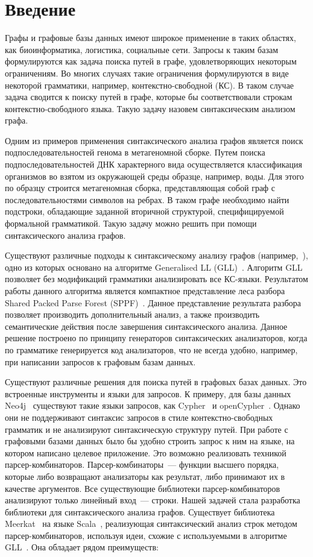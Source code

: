 \section*{Введение}
Графы и графовые базы данных имеют широкое применение в таких областях, как биоинформатика, логистика, социальные сети. Запросы к таким базам формулируются как задача поиска путей в графе, удовлетворяющих некоторым ограничениям. Во многих случаях такие ограничения формулируются в виде некоторой грамматики, например, контекстно-свободной (КС). В таком случае задача сводится к поиску путей в графе, которые бы соответствовали строкам контекстно-свободного языка. Такую задачу назовем синтаксическим анализом графа. 

Одним из примеров применения синтаксического анализа графов является поиск подпоследовательностей генома в метагеномной сборке. Путем поиска подпоследовательностей ДНК характерного вида осуществляется классификация организмов во взятом из окружающей среды образце, например, воды. Для этого по образцу строится метагеномная сборка, представляющая собой граф с последовательностями символов на ребрах. В таком графе необходимо найти подстроки, обладающие заданной вторичной структурой, специфицируемой формальной грамматикой. Такую задачу можно решить при помощи синтаксического анализа графов.

Существуют различные подходы к синтаксическому анализу графов (например,~\cite{GrigRagCFPQuerying,Hellings120,Sevon}), одно из которых основано на алгоритме Generalised LL (GLL)~\cite{GrigRagCFPQuerying}. Алгоритм GLL позволяет без модификаций грамматики анализировать все КС-языки. Результатом работы данного алгоритма является компактное представление леса разбора Shared Packed Parse Forest (SPPF)~\cite{SPPF}. Данное представление результата разбора позволяет производить дополнительный анализ, а также производить семантические действия после завершения синтаксического анализа. Данное решение построено по принципу генераторов синтаксических анализаторов, когда по грамматике генерируется код анализаторов, что не всегда удобно, например, при написании запросов к графовым базам данных.

Существуют различные решения для поиска путей в графовых базах данных. Это встроенные инструменты и языки для запросов. К примеру, для базы данных Neo4j~\cite{Neo4j} существуют такие языки запросов, как Cypher~\cite{Cypher} и openCypher~\cite{openCypher}. Однако они не поддерживают синтаксис запросов в стиле контекстно-свободных грамматик и не анализируют синтаксическую структуру путей. При работе с графовыми базами данных было бы удобно строить запрос к ним на языке, на котором написано целевое приложение. Это возможно реализовать техникой парсер-комбинаторов. Парсер-комбинаторы~--- функции высшего порядка, которые либо возвращают анализаторы как результат, либо принимают их в качестве аргументов. Все существующие библиотеки парсер-комбинаторов анализируют только линейный вход~--- строки. Нашей задачей стала разработка библиотеки для синтаксического анализа графов. Существует библиотека Meerkat~\cite{Meerkat} на языке Scala~\cite{Scala}, реализующая синтаксический анализ строк методом парсер-комбинаторов, используя идеи, схожие с используемыми в алгоритме GLL~\cite{GLL}. Она обладает рядом преимуществ:

